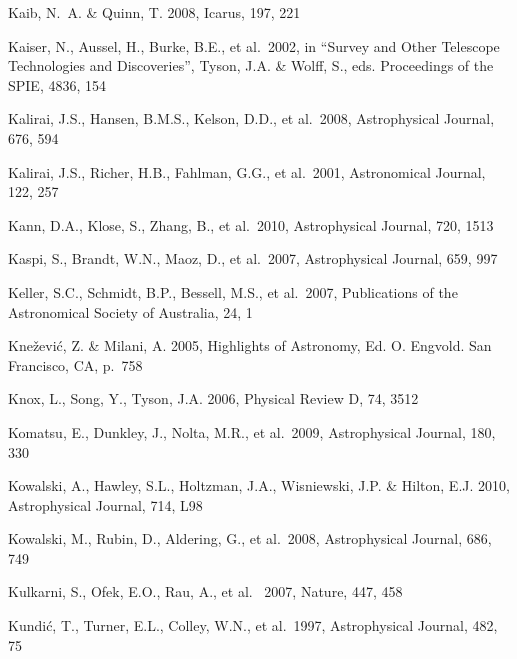 \documentclass{emulateapj}
\begin{document}
\begin{thebibliography}{}
\bibitem[()]{} Kaib, N.~A. \& Quinn, T. 2008, Icarus, 197, 221 

\bibitem[()]{} Kaiser, N., Aussel, H., Burke, B.E., et al.~2002, in ``Survey and Other Telescope 
             Technologies and Discoveries'', Tyson, J.A. \& Wolff, S.,
             eds. Proceedings of the SPIE, 4836, 154 

\bibitem[()]{} Kalirai, J.S., Hansen, B.M.S., Kelson, D.D., et al.~2008, Astrophysical Journal, 676, 594

\bibitem[()]{} Kalirai, J.S., Richer, H.B., Fahlman, G.G., et al.~2001, Astronomical Journal, 122, 257
	

\bibitem[()]{} Kann, D.A., Klose, S., Zhang, B., et al.~2010, Astrophysical Journal, 720, 1513 
 

\bibitem[()]{} Kaspi, S., Brandt, W.N., Maoz, D., et al.~2007, Astrophysical Journal, 659, 997

\bibitem[()]{} Keller, S.C., Schmidt, B.P., Bessell, M.S., et al.~2007, Publications of the Astronomical 
             Society of Australia, 24, 1

\bibitem[()]{} Kne\v{z}evi\'{c}, Z. \& Milani, A. 2005, Highlights of Astronomy, Ed. O. Engvold. San 
             Francisco, CA, p.~758

\bibitem[()]{} Knox, L., Song, Y., Tyson, J.A. 2006, Physical Review D, 74, 3512 

\bibitem[()]{} Komatsu, E., Dunkley, J., Nolta, M.R., et al.~2009, Astrophysical Journal, 180, 330 
	

\bibitem[()]{} Kowalski, A., Hawley, S.L., Holtzman, J.A., Wisniewski, J.P. \& Hilton, E.J. 2010, Astrophysical Journal, 714, L98

\bibitem[()]{} Kowalski, M., Rubin, D., Aldering, G., et al.~2008,  Astrophysical Journal, 686, 749

\bibitem[()]{} Kulkarni, S., Ofek, E.O., Rau, A., et al.~ 2007, Nature, 447, 458

\bibitem[()]{} Kundi\'{c}, T., Turner, E.L., Colley, W.N., et al.~1997, Astrophysical Journal, 482, 75


\end{thebibliography}
\end{document}
